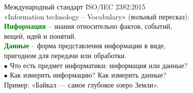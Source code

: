\newpage
\rhead{\textbf{\textcolor{blue}{Т}\textcolor{gray}{ерминология: Информация и данные}}}

\vspace*{5mm}
 Международный стандарт ISO/IEC 2382:2015\\
«Information technology – Vocabulary» (вольный пересказ):\\
\quad \quad \quad \textbf{\textcolor{Green}{Информация}} – знания относительно фактов, событий, \\ 
\quad \quad \quad вещей, идей и  понятий.\\
\quad \quad \quad \textbf{\textcolor{Green}{Данные}} – форма представления информации в виде, \\ 
\quad \quad \quad пригодном для передачи или обработки. \\
\vspace*{3mm}
$\bullet$ \quad Что есть предмет информатики: информация или данные? \\
$\bullet$ \quad Как измерить информацию? Как измерить данные?\\	
\qquad Пример: «Байкал — самое глубокое озеро Земли».
